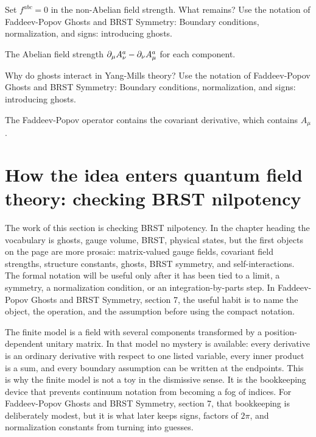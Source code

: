 \begin{exercise}
Set \(f^{abc}=0\) in the non-Abelian field strength.  What remains?  Use the notation of Faddeev-Popov Ghosts and BRST Symmetry: Boundary conditions, normalization, and signs: introducing ghosts.
\begin{answer}
The Abelian field strength \(\partial_\mu A_\nu^a-\partial_\nu A_\mu^a\) for each component.
\end{answer}
\end{exercise}

\begin{exercise}
Why do ghosts interact in Yang-Mills theory?  Use the notation of Faddeev-Popov Ghosts and BRST Symmetry: Boundary conditions, normalization, and signs: introducing ghosts.
\begin{answer}
The Faddeev-Popov operator contains the covariant derivative, which contains \(A_\mu\).
\end{answer}
\end{exercise}



\section{How the idea enters quantum field theory: checking BRST nilpotency}

The work of this section is checking BRST nilpotency.  In the chapter heading the vocabulary is ghosts, gauge volume, BRST, physical states, but the first objects on the page are more prosaic: matrix-valued gauge fields, covariant field strengths, structure constants, ghosts, BRST symmetry, and self-interactions.  The formal notation will be useful only after it has been tied to a limit, a symmetry, a normalization condition, or an integration-by-parts step.  In Faddeev-Popov Ghosts and BRST Symmetry, section 7, the useful habit is to name the object, the operation, and the assumption before using the compact notation.

The finite model is a field with several components transformed by a position-dependent unitary matrix.  In that model no mystery is available: every derivative is an ordinary derivative with respect to one listed variable, every inner product is a sum, and every boundary assumption can be written at the endpoints.  This is why the finite model is not a toy in the dismissive sense.  It is the bookkeeping device that prevents continuum notation from becoming a fog of indices.  For Faddeev-Popov Ghosts and BRST Symmetry, section 7, that bookkeeping is deliberately modest, but it is what later keeps signs, factors of \(2\pi\), and normalization constants from turning into guesses.

